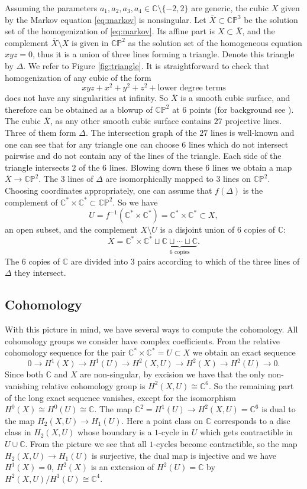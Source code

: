 \documentclass[12pt]{amsart}
\theoremstyle{definition}
\theoremstyle{remark}
\numberwithin{equation}{section}
\newcommand{\BC}{\mathbb C}
\newcommand{\BP}{\mathbb P}
\begin{document}
	Assuming the parameters $a_1,a_2,a_3,a_4\in \BC\setminus\{-2,2\}$ are generic, the cubic $X$ given by the Markov equation \eqref{eq:markov} is nonsingular. Let $\overline{X}\subset \BC\BP^3$ be the solution set of the homogenization of \eqref{eq:markov}. Its affine part is $X\subset \overline{X}$, and the complement $\overline{X}\setminus X$ is given in $\BC\BP^2$ as the solution set of the homogeneous equation $xyz=0$, thus it is a union of three lines forming a triangle. Denote this triangle by $\Delta$. We refer to Figure \ref{fig:triangle}. It is straightforward to check that homogenization of any cubic of the form 
	\[
	xyz + x^2 + y^2 + z^2 + \text{lower degree terms}
	\]
	does not have any singularities at infinity. So $\overline{X}$ is a smooth cubic surface, and therefore can be obtained as a blowup of $\BC\BP^2$ at $6$ points (for background see \cite{hartshorne1977algebraic}). The cubic $\overline{X}$, as any other smooth cubic surface contains $27$ projective lines. Three of them form $\Delta$. The intersection graph of the $27$ lines is well-known and one can see that for any triangle one can choose $6$ lines which do not intersect pairwise and do not contain any of the lines of the triangle. Each side of the triangle intersects $2$ of the $6$ lines. Blowing down these $6$ lines we obtain a map $\overline{X}\to \BC\BP^2$. The $3$ lines of $\Delta$  are isomorphically mapped to $3$ lines on $\BC\BP^2$. Choosing coordinates appropriately, one can assume that $f(\Delta)$ is the complement of $\BC^*\times\BC^*\subset \BC\BP^2$. So we have 
	\[
	U = f^{-1}(\BC^*\times\BC^*) = \BC^*\times\BC^* \subset X,
	\]
	an open subset, and the complement $X\setminus U$ is a disjoint union of $6$ copies of $\BC$:
	\[
	X = \BC^*\times\BC^* \sqcup \underbrace{\BC \sqcup \cdots \sqcup \BC}_{\text{$6$ copies}}.
	\]  
	The $6$ copies of $\BC$ are divided into $3$ pairs according to which of the three lines of $\Delta$ they intersect.
	
	\subsection{Cohomology}
	With this picture in mind, we have several ways to compute the cohomology. All cohomology groups we consider have complex coefficients. From the relative cohomology sequence for the pair $\BC^*\times\BC^* = U\subset X$ we obtain an exact sequence
	\[
	0\to H^1(X) \to H^1(U) \to H^2(X,U) \to H^2(X) \to H^2(U) \to 0.
	\] 
	Since both $\BC$ and $X$ are non-singular, by excision we have that the only non-vanishing relative cohomology group is $H^2(X, U)\cong \BC^6$. So the remaining part of the long exact sequence vanishes, except for the isomorphism $H^0(X)\cong H^0(U)\cong \BC$. The map $\BC^2 = H^1(U) \to H^2(X,U)=\BC^6$ is dual to the map $H_2(X,U) \to H_1(U)$. Here a point class on $\BC$ corresponds to a disc class in $H_2(X,U)$ whose boundary is a $1$-cycle in $U$ which gets contractible in $U\cup \BC$. From the picture we see that all $1$-cycles become contractible, so the map $H_2(X,U) \to H_1(U)$ is surjective, the dual map is injective and we have $H^1(X)=0$, $H^2(X)$ is an extension of $H^2(U)=\BC$ by $H^2(X,U)/H^1(U)\cong\BC^4$.
	
\end{document}
